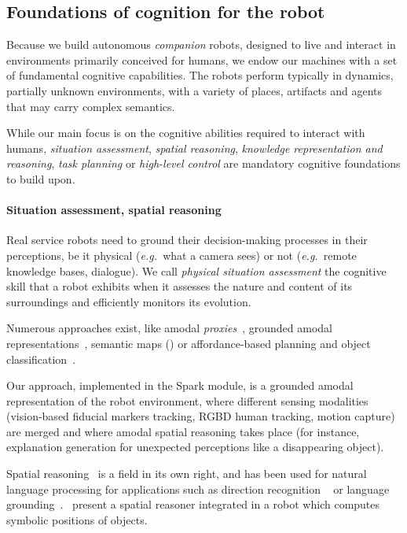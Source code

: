 \documentclass[preprint,3p,times]{elsarticle}
\newcommand{\eg}{{\textit{e.g.\ }}}
\begin{document}
\subsection{Foundations of cognition for the robot}

Because we build autonomous \emph{companion} robots, designed to live and
interact in environments primarily conceived for humans, we endow our machines
with a set of fundamental cognitive capabilities. The robots perform typically
in dynamics, partially unknown environments, with a variety of places,
artifacts and agents that may carry complex semantics.

While our main focus is on the cognitive abilities required to interact with
humans, \emph{situation assessment}, \emph{spatial reasoning}, \emph{knowledge
representation and reasoning}, \emph{task planning} or \emph{high-level
control} are mandatory cognitive foundations to build upon.

\paragraph{Situation assessment, spatial reasoning}

Real service robots need to ground their decision-making processes in their
perceptions, be it physical (\eg what a camera sees) or not (\eg remote
knowledge bases, dialogue). We call \emph{physical situation assessment} the
cognitive skill that a robot exhibits when it assesses the nature and content of its
surroundings and efficiently monitors its evolution.

Numerous approaches exist, like amodal \emph{proxies}~\cite{Jacobsson2008},
grounded amodal representations~\cite{Mavridis2006}, semantic maps
(\cite{Nuechter2008, Galindo2008,Blodow2011}) or
affordance-based planning and object classification~\cite{Lorken2008,
Varadarajan2011}.

Our approach, implemented in the {\sc Spark} module, is a grounded amodal
representation of the robot environment, where different sensing modalities
(vision-based fiducial markers tracking, RGBD human tracking, motion capture)
are merged and where amodal spatial reasoning takes place (for instance,
explanation generation for unexpected perceptions like a disappearing object).

Spatial reasoning~\cite{O'Keefe1999} is a field in its own right, and has been
used for natural language processing for applications such as direction
recognition ~\cite{Kollar2010,Matuszek2010} or language
grounding~\cite{Tellex2010}.~\cite{Skubic2004} present a spatial reasoner
integrated in a robot which computes symbolic positions of objects.
\end{document}

